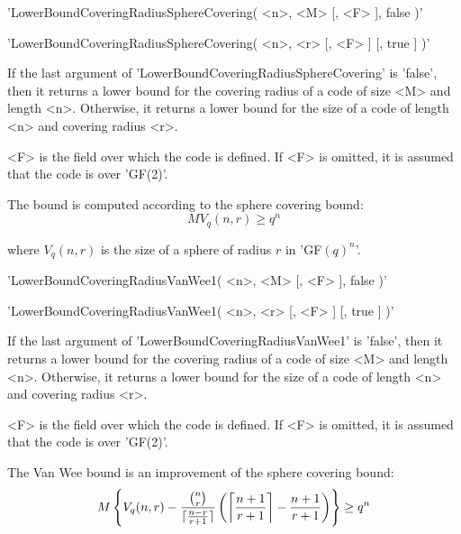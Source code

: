 'LowerBoundCoveringRadiusSphereCovering( <n>, <M> [, <F> ], false )'

'LowerBoundCoveringRadiusSphereCovering( <n>, <r> [, <F> ] [, true ] )'

If the last argument of 'LowerBoundCoveringRadiusSphereCovering' is
'false', then it returns a lower bound for the covering radius of a
code of size <M> and length <n>.
Otherwise, it returns a lower bound for the size of a code of length
<n> and covering radius <r>.

<F> is the field over which the code is defined. If <F> is omitted, it is
assumed that the code is over 'GF(2)'.

The bound is computed according to the sphere covering bound:
\begin{equation}
    M V_q(n,r) \geq q^n
\end{equation}

where $V_q(n,r)$ is the size of a sphere of radius $r$ in 'GF$(q)^n$'.




'LowerBoundCoveringRadiusVanWee1( <n>, <M> [, <F> ], false )'

'LowerBoundCoveringRadiusVanWee1( <n>, <r> [, <F> ] [, true ] )'

If the last argument of 'LowerBoundCoveringRadiusVanWee1' is
'false', then it returns a lower bound for the covering radius of a
code of size <M> and length <n>.
Otherwise, it returns a lower bound for the size of a code of length
<n> and covering radius <r>.

<F> is the field over which the code is defined. If <F> is omitted, it is
assumed that the code is over 'GF(2)'.

The Van Wee bound is an improvement of the sphere covering bound:
\begin{equation}
    M \left\{ V_q(n,r) -
    \frac{{{n} \choose {r}}}{\lceil\frac{n-r}{r+1}\rceil}
    \left(\left\lceil\frac{n+1}{r+1}\right\rceil - \frac{n+1}{r+1}\right)
    \right\} \geq q^n
\end{equation}



